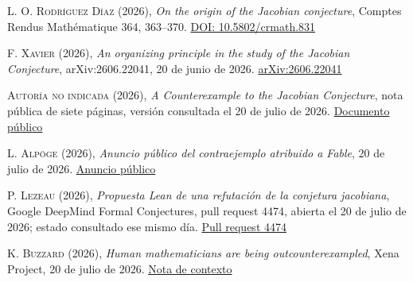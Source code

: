\documentclass[11pt]{article}
\theoremstyle{definition}
\theoremstyle{remark}
\newcommand{\bibauthor}[1]{\textsc{#1}}
\newcommand{\biblink}[2]{\href{#1}{\sffamily\footnotesize\color{teal!75!black}#2}}
\begin{document}
\begin{thebibliography}{99}
\bibauthor{L. O. Rodr\'iguez D\'iaz} (2026),
\emph{On the origin of the Jacobian conjecture},
Comptes Rendus Math\'ematique 364, 363--370.
\biblink{https://doi.org/10.5802/crmath.831}{DOI: 10.5802/crmath.831}

\bibauthor{F. Xavier} (2026),
\emph{An organizing principle in the study of the Jacobian Conjecture},
arXiv:2606.22041, 20 de junio de 2026.
\biblink{https://arxiv.org/abs/2606.22041}{arXiv:2606.22041}

\bibauthor{Autor\'ia no indicada} (2026),
\emph{A Counterexample to the Jacobian Conjecture},
nota p\'ublica de siete p\'aginas, versi\'on consultada el 20 de julio de 2026.
\biblink{https://www.ulam.ai/research/jacobian.pdf}{Documento p\'ublico}

\bibauthor{L. Alp\"oge} (2026),
\emph{Anuncio p\'ublico del contraejemplo atribuido a Fable},
20 de julio de 2026.
\biblink{https://x.com/__alpoge__/status/2079028340955197566}{Anuncio p\'ublico}

\bibauthor{P. Lezeau} (2026),
\emph{Propuesta Lean de una refutaci\'on de la conjetura jacobiana},
Google DeepMind Formal Conjectures, pull request 4474, abierta el 20 de julio
de 2026; estado consultado ese mismo d\'ia.
\biblink{https://github.com/google-deepmind/formal-conjectures/pull/4474}{Pull request 4474}

\bibauthor{K. Buzzard} (2026),
\emph{Human mathematicians are being outcounterexampled},
Xena Project, 20 de julio de 2026.
\biblink{https://xenaproject.wordpress.com/2026/07/20/human-mathematicians-are-being-outcounterexampled/}{Nota de contexto}

\end{thebibliography}
\end{document}
